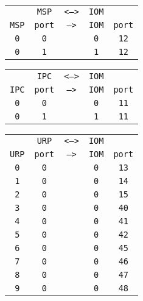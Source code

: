 \begin{adjustwidth}{5ex}{1ex}
	\begin{tabular}{ccccc}
		& \texttt{MSP} & \texttt{<-->} & \texttt{IOM} &  \\
		\texttt{MSP} & \texttt{port} & \texttt{-->} & \texttt{IOM} & \texttt{port} \\
		\texttt{0} & \texttt{0} & & \texttt{0} & \texttt{12} \\
		\texttt{0} & \texttt{1} & & \texttt{1} & \texttt{12} \\
	\end{tabular}
\end{adjustwidth}

\begin{adjustwidth}{5ex}{1ex}
	\begin{tabular}{ccccc}
		& \texttt{IPC} & \texttt{<-->} & \texttt{IOM} &  \\
		\texttt{IPC} & \texttt{port} & \texttt{-->} & \texttt{IOM} & \texttt{port} \\
		\texttt{0} & \texttt{0} & & \texttt{0} & \texttt{11} \\
		\texttt{0} & \texttt{1} & & \texttt{1} & \texttt{11} \\
	\end{tabular}
\end{adjustwidth}

\begin{adjustwidth}{5ex}{1ex}
	\begin{tabular}{ccccc}
		& \texttt{URP} & \texttt{<-->} & \texttt{IOM} &  \\
		\texttt{URP} & \texttt{port} & \texttt{-->} & \texttt{IOM} & \texttt{port} \\
		\texttt{0} & \texttt{0} & & \texttt{0} & \texttt{13} \\
		\texttt{1} & \texttt{0} & & \texttt{0} & \texttt{14} \\
		\texttt{2} & \texttt{0} & & \texttt{0} & \texttt{15} \\
		\texttt{3} & \texttt{0} & & \texttt{0} & \texttt{40} \\
		\texttt{4} & \texttt{0} & & \texttt{0} & \texttt{41} \\
		\texttt{5} & \texttt{0} & & \texttt{0} & \texttt{42} \\
		\texttt{6} & \texttt{0} & & \texttt{0} & \texttt{45} \\
		\texttt{7} & \texttt{0} & & \texttt{0} & \texttt{46} \\
		\texttt{8} & \texttt{0} & & \texttt{0} & \texttt{47} \\
		\texttt{9} & \texttt{0} & & \texttt{0} & \texttt{48} \\
	\end{tabular}
\end{adjustwidth}

